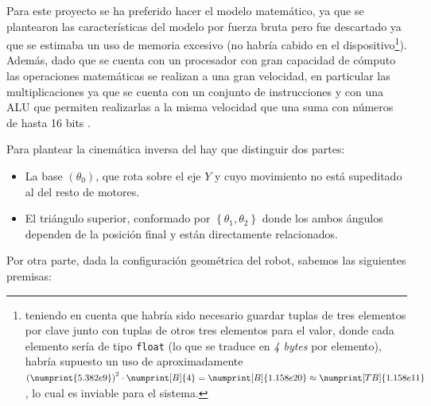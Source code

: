 Para este proyecto se ha preferido hacer el modelo matemático, ya que se plantearon las
características del modelo por fuerza bruta pero fue descartado ya que se estimaba un
uso de memoria excesivo (no habría cabido en el dispositivo\footnote{teniendo en cuenta
    que habría sido necesario guardar tuplas de tres elementos por clave junto con tuplas de
    otros tres elementos para el valor, donde cada elemento sería de tipo \texttt{float}
    (lo que se traduce en \textit{4 bytes} por elemento), habría supuesto un uso de
    aproximadamente $\left(\numprint{5.382e9}\right)^2 \cdot \numprint[B]{4} = \numprint[B]{1.158e20} \approx \numprint[TB]{1.158e11} $,
    lo cual es inviable para el sistema.}). Además, dado que se cuenta con un procesador
con gran capacidad de cómputo las operaciones matemáticas se realizan a una gran velocidad,
en particular las multiplicaciones ya que se cuenta con un conjunto de instrucciones y
con una \ac{ALU} que permiten realizarlas a la misma velocidad que una suma con números de hasta
16 bits \cite{microchipDsPIC33EPIC24EFRM2010}.

Para plantear la cinemática inversa del \pArm{} hay que distinguir dos partes:
\begin{itemize}
    \item La base $\left(\theta_0\right)$, que rota sobre el eje $Y$ y cuyo movimiento no está supeditado al
          del resto de motores.

    \item El triángulo superior, conformado por $\left\{\theta_1, \theta_2\right\}$ donde
          los ambos ángulos dependen de la posición final y están directamente relacionados.
\end{itemize}

Por otra parte, dada la configuración geométrica del robot, sabemos las siguientes premisas:

